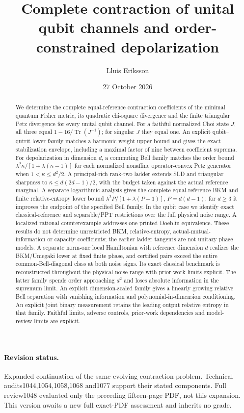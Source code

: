 \documentclass[11pt]{article}
\title{Complete contraction of unital qubit channels and order-constrained depolarization}
\author{Lluis Eriksson}
\date{27 October 2026}
\newcommand{\Tr}{\operatorname{Tr}}
\theoremstyle{remark}
\begin{document}
\maketitle
\begin{abstract}
We determine the complete equal-reference contraction coefficients of the minimal quantum Fisher metric, its quadratic chi-square divergence and the finite triangular Petz divergence for every unital qubit channel. For a faithful normalized Choi state $J$, all three equal $1-16/\Tr(J^{-1})$; for singular $J$ they equal one. An explicit qubit--qutrit lower family matches a harmonic-weight upper bound and gives the exact stabilization envelope, including a maximal factor of nine between coefficient suprema. For depolarization in dimension $d$, a commuting Bell family matches the order bound $\lambda^2\kappa/[1+\lambda(\kappa-1)]$ for each normalized nonaffine operator-convex Petz generator when $1<\kappa\le d^2/2$. A principal-rich rank-two ladder extends SLD and triangular sharpness to $\kappa\le d(2d-1)/2$, with the budget taken against the actual reference marginal. A separate logarithmic analysis gives the complete equal-reference BKM and finite relative-entropy lower bound $\lambda^2P/[1+\lambda(P-1)]$, $P=d(d-1)$; for $d\ge3$ it improves the endpoint of the specified Bell family. In the qubit case we identify exact classical-reference and separable/PPT restrictions over the full physical noise range. A localized rational counterexample addresses one printed Doeblin equivalence. These results do not determine unrestricted BKM, relative-entropy, actual-mutual-information or capacity coefficients; the earlier ladder tangents are not unitary phase models. A separate norm-one local Hamiltonian with reference dimension $d$ realizes the BKM/Umegaki lower at fixed finite phase, and certified pairs exceed the entire common-Bell-diagonal class at both noise signs. Its exact classical benchmark is reconstructed throughout the physical noise range with prior-work limits explicit. The latter family spends order approaching $d^2$ and loses absolute information in the supremum limit. An explicit dimension-scaled family gives a linearly growing relative Bell separation with vanishing information and polynomial-in-dimension conditioning. An explicit joint binary measurement retains the leading output relative entropy in that family. Faithful limits, adverse controls, prior-work dependencies and model-review limits are explicit.
\end{abstract}
\paragraph{Revision status.} Expanded continuation of the same evolving contraction problem. Technical audits1044,1054,1058,1068 and1077 support their stated components. Full review1048 evaluated only the preceding fifteen-page PDF, not this expansion. This version awaits a new full exact-PDF assessment and inherits no grade.
\end{document}
